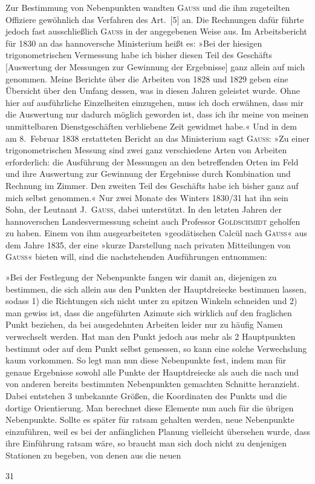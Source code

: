 Zur Bestimmung von Nebenpunkten wandten \textsc{Gauss} und die ihm zugeteilten Offiziere gewöhnlich das Verfahren des Art.~[5] an. Die Rechnungen dafür führte jedoch fast ausschließlich \textsc{Gauss} in der angegebenen Weise aus. Im Arbeitsbericht für 1830 an das hannoversche Ministerium heißt es: »Bei der hiesigen trigonometrischen Vermessung habe ich bisher diesen Teil des Geschäfts [Auswertung der Messungen zur Gewinnung der Ergebnisse] ganz allein auf mich genommen. Meine Berichte über die Arbeiten von 1828 und 1829 geben eine Übersicht über den Umfang dessen, was in diesen Jahren geleistet wurde. Ohne hier auf ausführliche Einzelheiten einzugehen, muss ich doch erwähnen, dass mir die Auswertung nur dadurch möglich geworden ist, dass ich ihr meine  von meinen unmittelbaren Dienstgeschäften verbliebene Zeit gewidmet habe.« Und in dem am 8.~Februar 1838 erstatteten Bericht an das Ministerium sagt \textsc{Gauss}: »Zu einer trigonometrischen Messung sind zwei ganz verschiedene Arten von Arbeiten erforderlich: die Ausführung der Messungen an den betreffenden Orten im Feld und ihre Auswertung zur Gewinnung der Ergebnisse durch Kombination und Rechnung im Zimmer. Den zweiten Teil des Geschäfts habe ich bisher ganz auf mich selbst genommen.« Nur zwei Monate des Winters 1830/31 hat ihn sein Sohn, der Leutnant J.~\textsc{Gauss}, dabei unterstützt. In den letzten Jahren der hannoverschen Landesvermessung scheint auch Professor \textsc{Goldschmidt} geholfen zu haben. Einem von ihm ausgearbeiteten »geodätischen Calcül nach \textsc{Gauss}« aus dem Jahre 1835, der eine »kurze Darstellung nach privaten Mitteilungen von \textsc{Gauss}« bieten will, sind die nachstehenden Ausführungen entnommen:

»Bei der Festlegung der Nebenpunkte fangen wir damit an, diejenigen zu bestimmen, die sich allein aus den Punkten der Hauptdreiecke  bestimmen lassen, sodass 1) die Richtungen sich nicht unter zu spitzen Winkeln schneiden und 2) man gewiss ist, dass die angeführten Azimute sich wirklich auf den fraglichen Punkt beziehen, da bei ausgedehnten Arbeiten leider nur zu häufig Namen verwechselt werden. Hat man den Punkt jedoch aus mehr als 2 Hauptpunkten bestimmt oder auf dem Punkt selbst gemessen, so kann eine solche Verwechslung kaum vorkommen. So legt man nun diese Nebenpunkte fest, indem man für genaue Ergebnisse sowohl alle Punkte der Hauptdreiecke als auch die nach und von anderen bereits bestimmten Nebenpunkten gemachten Schnitte heranzieht. Dabei entstehen 3 unbekannte Größen, die Koordinaten des Punkts und die dortige Orientierung. Man berechnet diese Elemente nun auch für die übrigen Nebenpunkte. Sollte es später für ratsam gehalten werden, neue Nebenpunkte einzuführen, weil es bei der anfänglichen Planung vielleicht übersehen wurde, dass ihre Einführung ratsam wäre, so braucht man sich doch nicht zu denjenigen Stationen zu begeben, von denen aus die neuen
\par\endgroup
\vfill{}\hfill31\hspace*{2cm}
\endgroup
